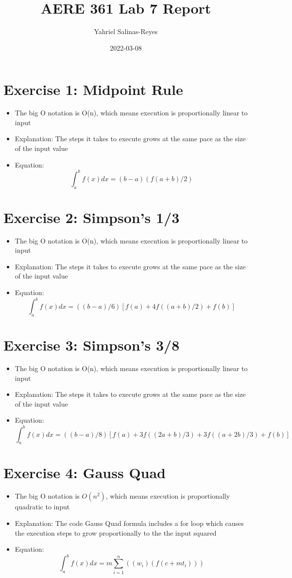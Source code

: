 \documentclass{article}
\title{AERE 361 Lab 7 Report}
\author{Yahriel Salinas-Reyes}
\date{2022-03-08}
\begin{document}
\maketitle

\newpage

\section{Exercise 1: Midpoint Rule}
\begin{itemize}
    \item{The big O notation is O(n), which means  execution is proportionally linear to input}
    \item{Explanation: The steps it takes to execute grows at the same pace as the size of the input value}
    \item{Equation: $$\int_{a}^{b}f(x)dx = (b-a)(f(a+b)/2)$$}
\end{itemize}

\section{Exercise 2: Simpson's 1/3}
\begin{itemize}
    \item{The big O notation is O(n), which means  execution is proportionally linear to input}
    \item{Explanation: The steps it takes to execute grows at the same pace as the size of the input value}
    \item{Equation: $$\int_{a}^{b}f(x)dx = ((b-a)/6)[f(a)+4f((a+b)/2)+f(b)]$$}
\end{itemize}

\section{Exercise 3: Simpson's 3/8}
\begin{itemize}
    \item{The big O notation is O(n), which means  execution is proportionally linear to input}
    \item{Explanation: The steps it takes to execute grows at the same pace as the size of the input value}
    \item{Equation: $$\int_{a}^{b}f(x)dx = ((b-a)/8)[f(a)+3f((2a+b)/3)+3f((a+2b)/3)+f(b)]$$}
\end{itemize}

\newpage

\section{Exercise 4: Gauss Quad}
\begin{itemize}
    \item{The big O notation is $O(n^2)$, which means  execution is proportionally quadratic to input}
    \item{Explanation: The code Gauss Quad formula includes a for loop which causes the execution steps to grow proportionally to the the input squared}
    \item{Equation: $$\int_{a}^{b}f(x)dx = m\sum_{i=1}^{n}((w_i)(f(c+mt_i)))$$}
\end{itemize}
\end{document}
